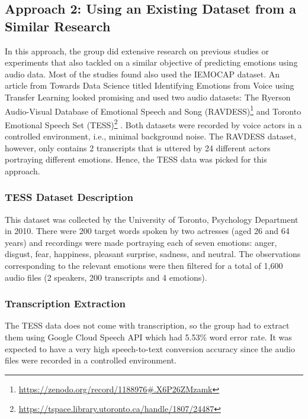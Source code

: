 \documentclass{article}
\newenvironment{subs}
  {\adjustwidth{3em}{0pt}}
  {\endadjustwidth}
\begin{document}
\begin{subs}
\subsection{Approach 2: Using an Existing Dataset from a Similar Research}
In this approach, the group did extensive research on previous studies or experiments that also tackled on a similar objective of predicting emotions using audio data. Most of the studies found also used the IEMOCAP dataset. An article from Towards Data Science titled Identifying Emotions from Voice using Transfer Learning\cite{towardsds} looked promising and used two audio datasets: The Ryerson Audio-Visual Database of Emotional Speech and Song (RAVDESS)\footnote{\url{https://zenodo.org/record/1188976\#.X6P26ZMzamk}} \cite{livingstone_steven_r_2018_1188976}and Toronto Emotional Speech Set (TESS)\footnote{\url{https://tspace.library.utoronto.ca/handle/1807/24487}} \cite{SP2/E8H2MF_2020}. Both datasets were recorded by voice actors in a controlled environment, i.e., minimal background noise. The RAVDESS dataset, however, only contains 2 transcripts that is uttered by 24 different actors portraying different emotions. Hence, the TESS data was picked for this approach.
\end{subs}

\begin{subs}
\subsubsection*{TESS Dataset Description}
This dataset was collected by the University of Toronto, Psychology Department in 2010. There were 200 target words spoken by two actresses (aged 26 and 64 years) and recordings were made portraying each of seven emotions: anger, disgust, fear, happiness, pleasant surprise, sadness, and neutral. The observations corresponding to the relevant emotions were then filtered for a total of 1,600 audio files (2 speakers, 200 transcripts and 4 emotions).
\end{subs}

\begin{subs}
\subsubsection*{Transcription Extraction}
The TESS data does not come with transcription, so the group had to extract them using Google Cloud Speech API which had 5.53\% word error rate. It was expected to have a very high speech-to-text conversion accuracy since the audio files were recorded in a controlled environment. 
\end{subs}
\end{document}

